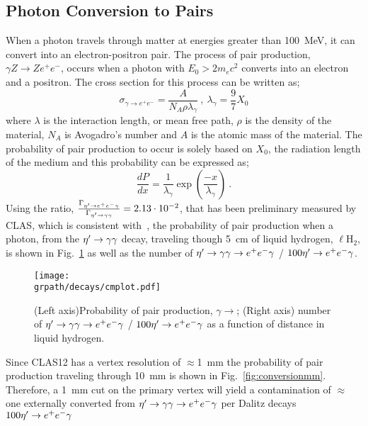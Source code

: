\subsection{Photon Conversion to \epemT Pairs}\label{sec:intro.conversion}
When a photon travels through matter at energies greater than 100~MeV, it can convert into an electron-positron pair. The process of pair production, $\gamma Z \rightarrow Ze^{+}e^{-}$, occurs when a photon with $E_0 > 2 m_e c^2$ converts into an electron and a positron. The cross section for this process can be written as;
\begin{equation}\label{pair_crosssection}
\sigma_{\gamma\rightarrow e^+e^-} =  \frac{A}{N_{A} \rho \lambda_\gamma}  \ ,\ \lambda_\gamma = \frac{9}{7}X_0
\end{equation}
where $\lambda$ is the interaction length, or mean free path, $\rho$ is the density of the material, $N_A$ is Avogadro's number and $A$ is the atomic mass of the material. The probability of pair production to occur is solely based on $X_{0}$, the radiation length of the medium and this probability can be expressed as;
\begin{equation}
\frac{dP}{dx} = \frac{1}{\lambda_\gamma}\exp(\frac{-x}{\lambda_\gamma}) \ .
\end{equation}
%
%
Using the ratio, $\frac{\Gamma_{\eta^{\prime} \to e^+e^- \gamma}}{\Gamma_{\eta^{\prime} \to \gamma \gamma}} = 2.13\cdot 10^{-2}$, that has been preliminary measured by CLAS, which is consistent with~\cite{BESIII}, the probability of pair production when a photon, from the $\eta^{\prime} \to \gamma \gamma$ decay, traveling though 5~cm of liquid hydrogen, $\ell$H$_2$, is shown in Fig.~\ref{fig:conversion} as well as the number of $\eta^{\prime} \to \gamma \gamma \rightarrow e^+e^- \gamma$ / $100 \eta^{\prime} \rightarrow e^+e^- \gamma$. 
\begin{figure}[h!]\begin{center}
	\texttt{[image: \\grpath/decays/cmplot.pdf]}
	\caption[Probability of pair production, $\gamma \to$\epemT, as a function of distance in liquid hydrogen]{\label{fig:conversion}{(Left axis)Probability of pair production, $\gamma \to$\epemT; (Right axis) number of $\eta^{\prime} \to \gamma \gamma \rightarrow e^+e^- \gamma$ / $100 \eta^{\prime} \rightarrow e^+e^- \gamma$ as a function of distance in liquid hydrogen.}}
\end{center}\end{figure}
	Since CLAS12 has a vertex resolution of $\approx$1~mm the probability of pair production traveling through 10~mm is shown in Fig.~\ref{fig:conversionmm}. Therefore, a 1~mm cut on the primary vertex will yield a contamination of $\approx$ one externally converted \epemT from $\eta^{\prime} \to \gamma \gamma \rightarrow e^+e^- \gamma$ per Dalitz decays $100 \eta^{\prime} \rightarrow e^+e^- \gamma$
